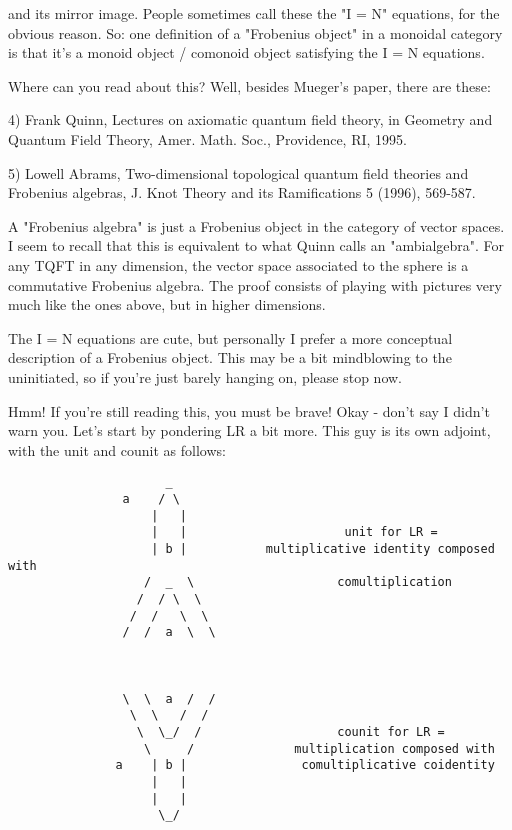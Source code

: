 and its mirror image.  People sometimes call these the "I = N"
equations, for the obvious reason.  So: one definition of a "Frobenius
object" in a monoidal category is that it's a monoid object / comonoid
object satisfying the I = N equations. 

Where can you read about this?  Well, besides Mueger's paper,
there are these:

4) Frank Quinn, Lectures on axiomatic quantum field theory, in 
Geometry and Quantum Field Theory, Amer. Math. Soc., Providence,
RI, 1995.  

5) Lowell Abrams, Two-dimensional topological quantum field theories
and Frobenius algebras, J. Knot Theory and its Ramifications 5 (1996),
569-587.

A "Frobenius algebra" is just a Frobenius object in the category
of vector spaces.  I seem to recall that this is equivalent to what
Quinn calls an "ambialgebra".  For any TQFT in any dimension, the 
vector space associated to the sphere is a commutative Frobenius
algebra.  The proof consists of playing with pictures very much 
like the ones above, but in higher dimensions.

The I = N equations are cute, but personally I prefer a more conceptual
description of a Frobenius object.  This may be a bit mindblowing to the
uninitiated, so if you're just barely hanging on, please stop now.

Hmm!  If you're still reading this, you must be brave!  Okay - don't
say I didn't warn you.  Let's start by pondering LR a bit more.  
This guy is its own adjoint, with the unit and counit as follows:

\begin{verbatim}
                      _
                a    / \      
                    |   |                     
                    |   |                      unit for LR =
                    | b |           multiplicative identity composed with
                   /  _  \                    comultiplication                
                  /  / \  \
                 /  /   \  \
                /  /  a  \  \



                \  \  a  /  /
                 \  \   /  /                 
                  \  \_/  /                   counit for LR =
                   \     /              multiplication composed with 
               a    | b |                comultiplicative coidentity
                    |   |
                    |   |
                     \_/
\end{verbatim}
    
